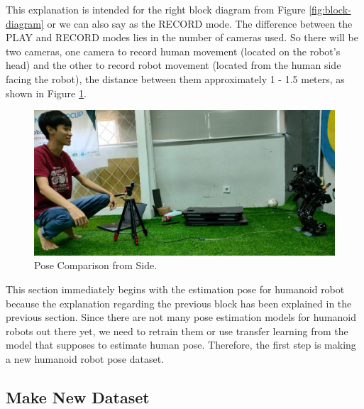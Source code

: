 This explanation is intended for the right block diagram from Figure \ref{fig:block-diagram} or we can also say as the RECORD mode. The difference between the PLAY and RECORD modes lies in the number of cameras used.
So there will be two cameras, one camera to record human movement (located on the robot's head) and the other to record robot movement (located from the human side facing the robot), the distance between them approximately 1 - 1.5 meters, as shown in Figure \ref{fig:pose-comparison-side}.
\begin{figure}[ht]
  \centering
  \includegraphics[scale=0.3]{gambar/pose-comparison.jpeg}
  \caption{Pose Comparison from Side.}
  \label{fig:pose-comparison-side}
\end{figure}

This section immediately begins with the estimation pose for humanoid robot because the explanation regarding the previous block has been explained in the previous section.
Since there are not many pose estimation models for humanoid robots out there yet, we need to retrain them or use transfer learning from the model that supposes to estimate human pose.
Therefore, the first step is making a new humanoid robot pose dataset.

\subsection{Make New Dataset}
\label{subsec:make-new-dataset}

